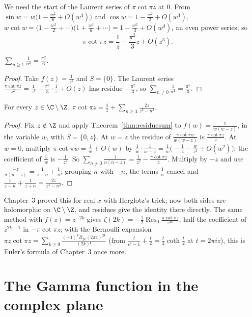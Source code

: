 We need the start of the Laurent series of $\pi\cot\pi z$ at $0$. From $\sin w=w\bigl(1-\frac{w^2}6+O(w^4)\bigr)$ and $\cos w=1-\frac{w^2}2+O(w^4)$,
$w\cot w=\bigl(1-\frac{w^2}2+\cdots\bigr)\bigl(1+\frac{w^2}6+\cdots\bigr)=1-\frac{w^2}3+O(w^4)$, an even power series; so
\[
\pi\cot\pi z=\frac1z-\frac{\pi^2}3z+O(z^3).
\]

\begin{corollary}\label{cor:baselres}
$\displaystyle\sum_{n\ge1}\frac1{n^2}=\frac{\pi^2}6$.
\end{corollary}
\begin{proof}
Take $f(z)=\frac1{z^2}$ and $S=\{0\}$. The Laurent series $\frac{\pi\cot\pi z}{z^2}=\frac1{z^3}-\frac{\pi^2}3\cdot\frac1z+O(z)$ has residue $-\frac{\pi^2}3$, so $\sum_{n\ne0}\frac1{n^2}=\frac{\pi^2}3$.
\end{proof}

\begin{corollary}\label{cor:cotc}
For every $z\in\C\setminus\Z$, $\displaystyle\pi\cot\pi z=\frac1z+\sum_{n\ge1}\frac{2z}{z^2-n^2}$.
\end{corollary}
\begin{proof}
Fix $z\notin\Z$ and apply Theorem~\ref{thm:residuesum} to $f(w)=\frac1{w(w-z)}$, in the variable $w$, with $S=\{0,z\}$. At $w=z$ the residue of
$\frac{\pi\cot\pi w}{w(w-z)}$ is $\frac{\pi\cot\pi z}z$. At $w=0$, multiply $\pi\cot\pi w=\frac1w+O(w)$ by $\frac1w\cdot\frac1{w-z}=\frac1w\bigl(-\frac1z-\frac w{z^2}+O(w^2)\bigr)$: the coefficient of $\frac1w$ is
$-\frac1{z^2}$. So $\sum_{n\ne0}\frac1{n(n-z)}=\frac1{z^2}-\frac{\pi\cot\pi z}z$. Multiply by $-z$ and use $\frac{-z}{n(n-z)}=\frac1{z-n}+\frac1n$; grouping $n$ with $-n$,
the terms $\frac1n$ cancel and $\frac1{z-n}+\frac1{z+n}=\frac{2z}{z^2-n^2}$.
\end{proof}

Chapter~3 proved this for real $x$ with Herglotz's trick; now both sides are holomorphic on $\C\setminus\Z$, and residues give
the identity there directly. The same method with $f(z)=z^{-2k}$ gives $\zeta(2k)=-\frac12\operatorname{Res}_0\frac{\pi\cot\pi z}{z^{2k}}$, half the coefficient of $z^{2k-1}$ in
$-\pi\cot\pi z$; with the Bernoulli expansion $\pi z\cot\pi z=\sum_{k\ge0}\frac{(-1)^kB_{2k}(2\pi z)^{2k}}{(2k)!}$ (from $\frac t{e^t-1}+\frac t2=\frac t2\coth\frac t2$ at $t=2\pi iz$), this is
Euler's formula of Chapter~3 once more.

\section{The Gamma function in the complex plane}\label{sec:gammac}

